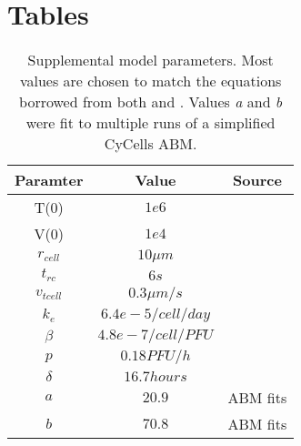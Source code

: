 \documentclass[10pt]{article}
\begin{document}
%

\pagebreak

\section*{Tables}



\renewcommand{\thetable}{S\arabic{table}}

\begin{table}[!ht]
\begin{center}
\begin{tabular}{ | c | c | c | }
  \hline                        
  Paramter & Value & Source \\
  \hline
  T(0) & $1e6$ & \cite{Mitchell2011} \\
  V(0) &  $1e4$ & \cite{Mitchell2011} \\
  $r_{cell}$ &  $10 \mu m$ & \cite{Miao2010} \\
  $t_{rc}$ & $6s$ & \cite{Peters1983} \\
  $v_{tcell}$ & $0.3 \mu m/s$ & \cite{Miller2003} \\
  $k_e$ & $6.4e-5/cell/day$ & \cite{Miao2010} \\
  $\beta$ & $4.8e-7/cell/PFU$ & \cite{Mitchell2011} \\
  $p$ & $0.18 PFU/h$ & \cite{Mitchell2011} \\
  $\delta$ & $16.7 hours$ & \cite{Mitchell2011} \\
  $a$ & $20.9$ & ABM fits \\
  $b$ & $70.8$ & ABM fits \\
  \hline  
\end{tabular}
\caption{Supplemental model parameters.  Most values are chosen to match the equations borrowed from both \cite{Mitchell2011} and \cite{Miao2010}.  Values \textit{a} and \textit{b} were fit to multiple runs of a simplified CyCells ABM.}
\label{table:supplement}
\end{center}
\end{table}
\end{document}
